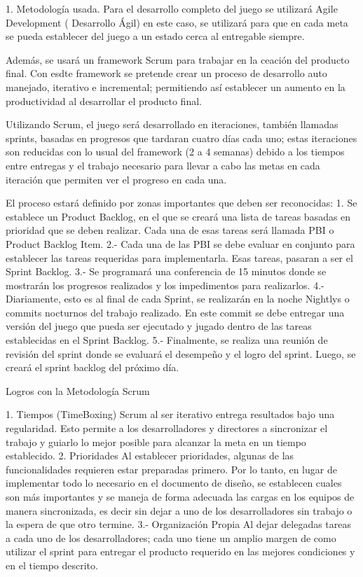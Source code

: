 1.  Metodología usada. 
Para el desarrollo completo del juego se utilizará Agile Development ( Desarrollo Ágil)  en este caso, se utilizará para que en cada meta se pueda establecer del juego a un estado cerca al entregable siempre.

Además, se usará un framework Scrum para trabajar en la ceación del producto final. Con esdte framework se pretende crear un proceso de desarrollo auto manejado, iterativo e incremental; permitiendo así establecer un aumento en la productividad al desarrollar el producto final.

Utilizando Scrum, el juego será desarrollado en iteraciones, también llamadas sprints, basadas en progresos que tardaran cuatro días cada uno; estas iteraciones son reducidas con lo usual del framework (2 a 4 semanas) debido a los tiempos entre entregas y el trabajo necesario para llevar a cabo las metas en cada iteración que permiten ver el progreso en cada una. 

El proceso estará definido por zonas importantes que deben ser reconocidas:
1.  Se establece un Product Backlog, en el que se creará una lista de tareas basadas en prioridad que se deben realizar. Cada una de esas tareas será llamada PBI o Product Backlog Item.
2.-  Cada una de las PBI se debe evaluar en conjunto para establecer las tareas requeridas para implementarla. Esas tareas, pasaran a ser el Sprint Backlog. 
3.-  Se programará una conferencia de 15 minutos donde se mostrarán los progresos realizados y los impedimentos para realizarlos.
4.- Diariamente, esto es al final de cada Sprint,  se realizarán en la noche Nightlys o commits nocturnos del trabajo realizado. En este commit se debe entregar una versión del juego que pueda ser ejecutado y jugado dentro de las tareas establecidas en el Sprint Backlog.
5.- Finalmente, se realiza una reunión de revisión del sprint donde se evaluará el desempeño y el logro del sprint. Luego, se creará el sprint backlog del próximo día.

Logros con la Metodología Scrum

1. Tiempos (TimeBoxing)
Scrum al ser iterativo entrega resultados bajo una regularidad. Esto permite a los desarrolladores y directores a sincronizar el trabajo y guiarlo lo mejor posible para alcanzar la meta en un tiempo establecido.
2. Prioridades
Al establecer prioridades, algunas de las funcionalidades requieren estar preparadas primero. Por lo tanto, en lugar de implementar todo lo necesario en el documento de diseño, se establecen cuales son más importantes y se maneja de forma adecuada las cargas en los equipos de manera sincronizada, es decir sin dejar a uno de los desarrolladores sin trabajo o la espera de que otro termine.
3.- Organización Propia
Al dejar delegadas tareas a cada uno de los desarrolladores; cada uno tiene un amplio margen de como utilizar el sprint para entregar el producto requerido en las mejores condiciones y en el tiempo descrito.

